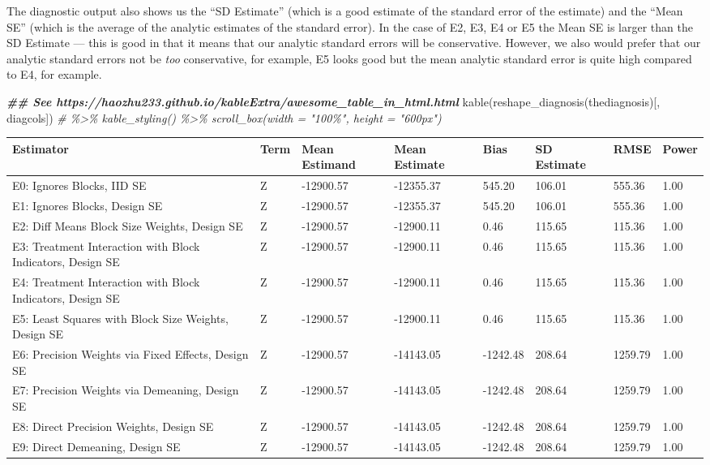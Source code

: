 \documentclass[
  12pt,
]{book}
\newenvironment{Shaded}{\begin{snugshade}}{\end{snugshade}}
\newcommand{\CommentTok}[1]{\textcolor[rgb]{0.56,0.35,0.01}{\textit{#1}}}
\newcommand{\DocumentationTok}[1]{\textcolor[rgb]{0.56,0.35,0.01}{\textbf{\textit{#1}}}}
\newcommand{\FunctionTok}[1]{\textcolor[rgb]{0.00,0.00,0.00}{#1}}
\newcommand{\NormalTok}[1]{#1}
\theoremstyle{definition}
\theoremstyle{definition}
\theoremstyle{definition}
\theoremstyle{remark}
\begin{document}
The diagnostic output also shows us the ``SD Estimate'' (which is a good
estimate of the standard error of the estimate) and the ``Mean SE''
(which is the average of the analytic estimates of the standard error).
In the case of E2, E3, E4 or E5 the Mean SE is larger than the SD
Estimate --- this is good in that it means that our analytic standard
errors will be conservative. However, we also would prefer that our
analytic standard errors not be \emph{too} conservative, for example, E5
looks good but the mean analytic standard error is quite high compared
to E4, for example.

\begin{Shaded}
\begin{Highlighting}[]
\DocumentationTok{\#\# See https://haozhu233.github.io/kableExtra/awesome\_table\_in\_html.html}
\FunctionTok{kable}\NormalTok{(}\FunctionTok{reshape\_diagnosis}\NormalTok{(thediagnosis)[, diagcols]) }\CommentTok{\# \%\textgreater{}\% kable\_styling() \%\textgreater{}\% scroll\_box(width = "100\%", height = "600px")}
\end{Highlighting}
\end{Shaded}

\begin{tabular}{l|l|l|l|l|l|l|l}
\hline
Estimator & Term & Mean Estimand & Mean Estimate & Bias & SD Estimate & RMSE & Power\\
\hline
E0: Ignores Blocks, IID SE & Z & -12900.57 & -12355.37 & 545.20 & 106.01 & 555.36 & 1.00\\
\hline
E1: Ignores Blocks, Design SE & Z & -12900.57 & -12355.37 & 545.20 & 106.01 & 555.36 & 1.00\\
\hline
E2: Diff Means Block Size Weights, Design SE & Z & -12900.57 & -12900.11 & 0.46 & 115.65 & 115.36 & 1.00\\
\hline
E3: Treatment Interaction with Block Indicators, Design SE & Z & -12900.57 & -12900.11 & 0.46 & 115.65 & 115.36 & 1.00\\
\hline
E4: Treatment Interaction with Block Indicators, Design SE & Z & -12900.57 & -12900.11 & 0.46 & 115.65 & 115.36 & 1.00\\
\hline
E5: Least Squares with Block Size Weights, Design SE & Z & -12900.57 & -12900.11 & 0.46 & 115.65 & 115.36 & 1.00\\
\hline
E6: Precision Weights via Fixed Effects, Design SE & Z & -12900.57 & -14143.05 & -1242.48 & 208.64 & 1259.79 & 1.00\\
\hline
E7: Precision Weights via Demeaning, Design SE & Z & -12900.57 & -14143.05 & -1242.48 & 208.64 & 1259.79 & 1.00\\
\hline
E8: Direct Precision Weights, Design SE & Z & -12900.57 & -14143.05 & -1242.48 & 208.64 & 1259.79 & 1.00\\
\hline
E9: Direct Demeaning, Design SE & Z & -12900.57 & -14143.05 & -1242.48 & 208.64 & 1259.79 & 1.00\\
\hline
\end{tabular}
\end{document}
